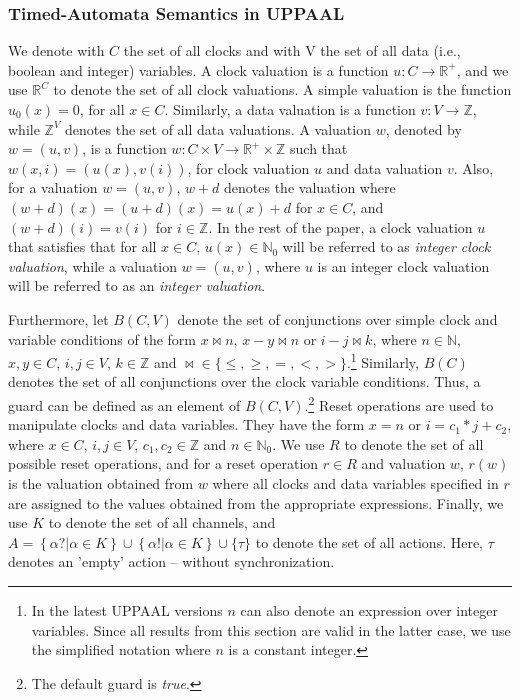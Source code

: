 \subsubsection{Timed-Automata Semantics in UPPAAL}
We denote with $C$ the set of all clocks and with V the set of all data (i.e., boolean and integer) variables. A clock valuation is a function $u: C\rightarrow \mathbb{R}^+$, and we use $\mathbb{R}^C$ to denote the set of all clock valuations. A simple valuation is the function $u_0(x)=0$, for all $x\in C$. Similarly, a data valuation is a function $v: V\rightarrow \mathbb{Z}$, while $\mathbb{Z}^V$ denotes the set of all data valuations. A valuation $w$, denoted by $w = (u,v)$, is a function $w: C\times V\rightarrow \mathbb{R}^+\times \mathbb{Z}$ such that $w(x,i)=(u(x),v(i))$, for clock valuation $u$ and data valuation $v$. Also, for a valuation $w=(u,v)$, $w+d$ denotes the valuation where $(w+d)(x) = (u+d)(x)=u(x)+d$ for $x\in C$, and $(w+d)(i)=v(i)$ for $i\in\mathbb{Z}$. 
In the rest of the paper, a clock valuation $u$ that satisfies that for all $x\in C$, $u(x)\in\mathbb{N}_0$ will be referred to as \textit{integer clock valuation}, while a valuation $w=(u,v)$, where $u$ is an integer clock valuation will be referred to as an \textit{integer valuation}.

Furthermore, let $B(C,V)$ denote the set of conjunctions over simple clock and variable conditions of the form $x\bowtie n$, $x-y\bowtie n$ or $i-j\bowtie k$, where $n\in \mathbb{N}$, $x,y\in C$, $i,j\in V$, $k\in\mathbb{Z}$ and $\bowtie\in\{\leq,\geq,=,<,>\}$.\footnote{In the latest UPPAAL versions $n$ can also denote an expression over integer variables. Since all results from this section are valid in the latter case, we use the simplified notation where $n$ is a constant integer.} Similarly, $B(C)$ denotes the set of all conjunctions over the clock variable conditions. Thus, a guard can be defined as an element of $B(C,V)$.\footnote{The default guard is \textit{true}.} 
Reset operations are used to manipulate clocks and data variables. They have the form $x=n$ or $i=c_1*j+c_2$, where $x\in C$, $i,j\in V$, $c_1,c_2\in \mathbb{Z}$ and $n\in\mathbb{N}_0$. We use $R$ to denote the set of all possible reset operations, and for a reset operation $r\in R$ and valuation $w$, $r(w)$ is the valuation obtained from $w$ where all clocks and data variables specified in $r$ are assigned to the values obtained from the appropriate expressions. 
Finally, we use $K$ to denote the set of all channels, and $A=\left\{\alpha ? | \alpha\in K\right\}\cup\left\{\alpha !|\alpha\in K\right\}\cup \{\tau\}$ to denote the set of all actions. Here, $\tau$ denotes an 'empty' action -- without synchronization.


